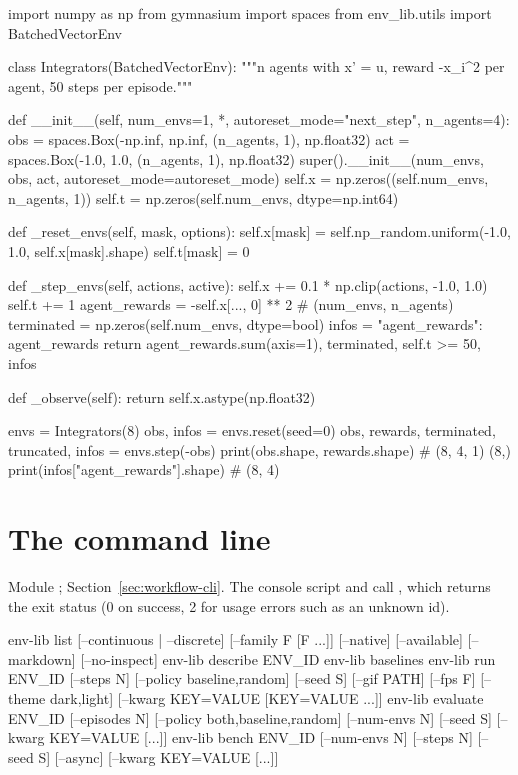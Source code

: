 \begin{pycode}
import numpy as np
from gymnasium import spaces
from env_lib.utils import BatchedVectorEnv

class Integrators(BatchedVectorEnv):
    """n agents with x' = u, reward -x_i^2 per agent, 50 steps per episode."""

    def __init__(self, num_envs=1, *, autoreset_mode="next_step", n_agents=4):
        obs = spaces.Box(-np.inf, np.inf, (n_agents, 1), np.float32)
        act = spaces.Box(-1.0, 1.0, (n_agents, 1), np.float32)
        super().__init__(num_envs, obs, act, autoreset_mode=autoreset_mode)
        self.x = np.zeros((self.num_envs, n_agents, 1))
        self.t = np.zeros(self.num_envs, dtype=np.int64)

    def _reset_envs(self, mask, options):
        self.x[mask] = self.np_random.uniform(-1.0, 1.0, self.x[mask].shape)
        self.t[mask] = 0

    def _step_envs(self, actions, active):
        self.x += 0.1 * np.clip(actions, -1.0, 1.0)
        self.t += 1
        agent_rewards = -self.x[..., 0] ** 2               # (num_envs, n_agents)
        terminated = np.zeros(self.num_envs, dtype=bool)
        infos = {"agent_rewards": agent_rewards}
        return agent_rewards.sum(axis=1), terminated, self.t >= 50, infos

    def _observe(self):
        return self.x.astype(np.float32)

envs = Integrators(8)
obs, infos = envs.reset(seed=0)
obs, rewards, terminated, truncated, infos = envs.step(-obs)
print(obs.shape, rewards.shape)             # (8, 4, 1) (8,)
print(infos["agent_rewards"].shape)         # (8, 4)
\end{pycode}

\section{The \texorpdfstring{}{env-lib} command line}\label{sec:api-cli}

Module ; Section~\ref{sec:workflow-cli}. The console
script  and  call
, which returns the exit
status (0 on success, 2 for usage errors such as an unknown id).

\begin{shellcode}
env-lib list [--continuous | --discrete] [--family F [F ...]] [--native]
             [--available] [--markdown] [--no-inspect]
env-lib describe ENV_ID
env-lib baselines
env-lib run ENV_ID [--steps N] [--policy {baseline,random}] [--seed S]
            [--gif PATH] [--fps F] [--theme {dark,light}]
            [--kwarg KEY=VALUE [KEY=VALUE ...]]
env-lib evaluate ENV_ID [--episodes N] [--policy {both,baseline,random}]
                 [--num-envs N] [--seed S] [--kwarg KEY=VALUE [...]]
env-lib bench ENV_ID [--num-envs N] [--steps N] [--seed S] [--async]
              [--kwarg KEY=VALUE [...]]
\end{shellcode}


